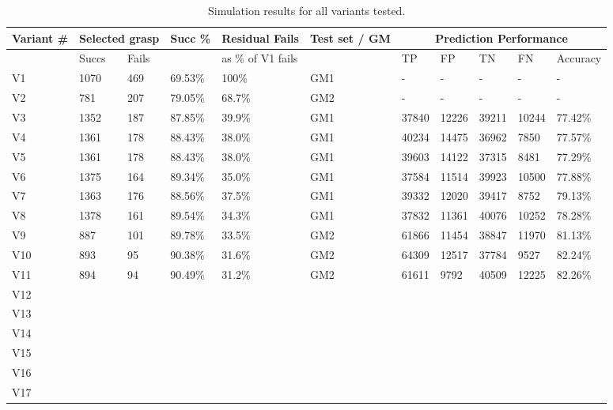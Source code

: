 \begin{table}[]
\centering
\begin{tabular}{|l|l|l|l|l|l|l|l|l|l|l|}
\hline
Variant \# & \multicolumn{2}{|c|}{Selected grasp} &  Succ \% & Residual Fails & Test set / GM& \multicolumn{5}{|c|}{Prediction Performance} \\ \hline
 & Succs & Fails &  & as \% of V1 fails &  & TP & FP & TN & FN & Accuracy \\ \hline
V1 & 1070   & 469 & 69.53\% & 100\% & GM1 & - & - & - & - & - \\ \hline
V2 &  781   & 207 & 79.05\% & 68.7\% & GM2 & - & - & - & - & - \\ \hline
V3 & 1352 & 187 & 87.85\% & 39.9\% & GM1 & 37840 &	12226 & 39211 & 10244 & 77.42\% \\ \hline
V4 &  1361 & 178 & 88.43\% & 38.0\% & GM1 & 40234 &	14475 & 36962 & 7850 & 77.57\% \\ \hline

V5 & 1361 & 178 & 88.43\% & 38.0\%& GM1 & 39603 & 14122 &37315 & 8481	& 77.29\% \\ \hline

V6 & 1375 & 164 & 89.34\% & 35.0\% & GM1 & 37584 &	11514 & 39923 &10500	& 77.88\% \\ \hline
V7 & 1363 & 176 & 88.56\% & 37.5\% & GM1 & 39332 &	12020 & 39417 & 8752 & 79.13\% \\ \hline
V8 & 1378 & 161 & 89.54\% & 34.3\% & GM1 & 37832 &	11361 & 40076	& 10252 & 78.28\% \\ \hline
V9 & 887 & 101 & 89.78\% & 33.5\% & GM2 & 61866 &	11454& 38847& 11970 & 81.13\% \\ \hline
V10 & 893 & 95 & 90.38\% & 31.6\% & GM2 & 64309 &	12517 & 37784 & 9527 & 82.24\% \\ \hline
V11 & 894 & 94 & 90.49\% & 31.2\% & GM2 & 61611 & 9792 & 40509 & 12225 & 82.26\% \\ \hline
V12 & & & & & & & & & & \\ \hline
V13 & & & & & & & & & & \\ \hline
V14 & & & & & & & & & & \\ \hline
V15 & & & & & & & & & & \\ \hline
V16 & & & & & & & & & & \\ \hline
V17 & & & & & & & & & & \\ \hline
\end{tabular}
\caption{Simulation results for all variants tested.}
\label{table:Results-sim}
\end{table}

